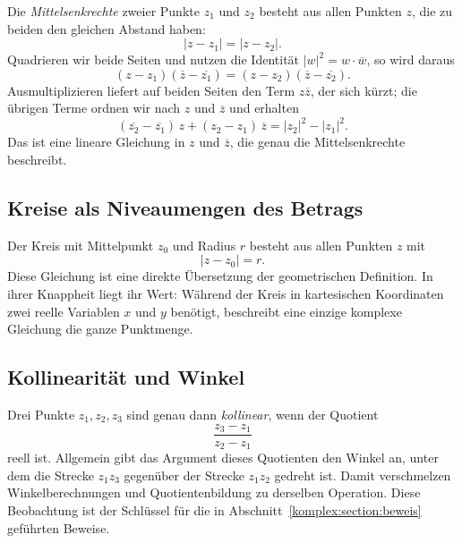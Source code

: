 Die \emph{Mittelsenkrechte} zweier Punkte $z_1$ und $z_2$ besteht aus allen
%
Punkten $z$, die zu beiden den gleichen Abstand haben:
\begin{equation}
|z - z_1|
=
|z - z_2| .
\label{komplex:eq:mittelsenkrechte}
\end{equation}
Quadrieren wir beide Seiten und nutzen die Identität
$|w|^2 = w \cdot \overline{w}$, so wird daraus
\[
(z - z_1)(\overline{z} - \overline{z_1})
=
(z - z_2)(\overline{z} - \overline{z_2}) .
\]
Ausmultiplizieren liefert auf beiden Seiten den Term $z \overline{z}$,
der sich kürzt; die übrigen Terme ordnen wir nach $z$ und $\overline{z}$
und erhalten
\begin{equation}
(\overline{z_2} - \overline{z_1}) \, z
+ (z_2 - z_1) \, \overline{z}
=
|z_2|^2 - |z_1|^2 .
\label{komplex:eq:mittelsenkrechte-linear}
\end{equation}
Das ist eine lineare Gleichung in $z$ und $\overline{z}$, die genau die
Mittelsenkrechte beschreibt.

%
%
\subsection{Kreise als Niveaumengen des Betrags
\label{komplex:subsection:kreise}}
%
Der Kreis mit Mittelpunkt $z_0$ und Radius $r$ besteht aus allen Punkten
$z$ mit
\begin{equation}
|z - z_0|
=
r .
\label{komplex:eq:kreis}
\end{equation}
Diese Gleichung ist eine direkte Übersetzung der geometrischen Definition.
In ihrer Knappheit liegt ihr Wert:
Während der Kreis in kartesischen Koordinaten zwei reelle Variablen $x$
und $y$ benötigt, beschreibt eine einzige komplexe Gleichung die ganze
Punktmenge.

%
%
\subsection{Kollinearität und Winkel
\label{komplex:subsection:winkel}}
Drei Punkte $z_1, z_2, z_3$ sind genau dann \emph{kollinear},
%
wenn der Quotient
\begin{equation}
\frac{z_3 - z_1}{z_2 - z_1}
\label{komplex:eq:quotient}
\end{equation}
reell ist.
Allgemein gibt das Argument dieses Quotienten den Winkel an,
unter dem die Strecke $z_1 z_3$ gegenüber der Strecke $z_1 z_2$ gedreht
ist.
Damit verschmelzen Winkelberechnungen und Quotientenbildung zu derselben
Operation.
Diese Beobachtung ist der Schlüssel für die in
Abschnitt~\ref{komplex:section:beweis} geführten Beweise.
